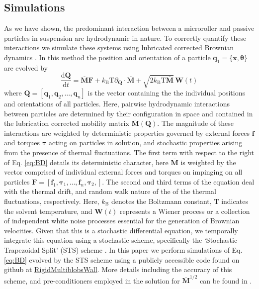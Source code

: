 \documentclass[12pt]{article}
\begin{document}
\subsection*{Simulations}

As we have shown, the predominant interaction between a microroller and passive particles in suspension are hydrodynamic in nature. To correctly quantify these interactions we simulate these systems using lubricated corrected Brownian dynamics \cite{sprinkle_driven_2020}. In this method the position and orientation of a particle $\mathbf{q}_1 = \{ \mathbf{x}, \mathbf{\theta} \}$ are evolved by 
\begin{equation}
    \frac{\mathrm{d} \mathbf{Q}}{\mathrm{d} t} = \overline{\mathbf{M}} \mathbf{F} + k_\mathrm{B} \mathrm{T} \partial_\mathbf{Q} \cdot \overline{\mathbf{M}} + \sqrt{2 k_\mathrm{B} \mathrm{T} \overline{\mathbf{M}}} \, \mathcal{\mathbf{W}}(t)
\label{eq:BD}
\end{equation}
where $\mathbf{Q} = \left [ \mathbf{q}_1, \mathbf{q}_2, \dots, \mathbf{q}_n \right ]$ is the vector containing the the individual positions and orientations of all particles. Here, pairwise hydrodynamic interactions between particles are determined by their configuration in space and contained in the lubrication corrected mobility matrix $\overline{\mathbf{M}} \left ( \mathbf{Q} \right )$. The magnitude of these interactions are weighted by deterministic properties governed by external forces $\mathbf{f}$ and torques $\mathbf{\tau}$ acting on particles in solution, and stochastic properties arising from the presence of thermal fluctuations. The first term with respect to the right of Eq. \ref{eq:BD} details its deterministic character, here $\overline{\mathbf{M}}$ is weighted by the vector comprised of individual external forces and torques on impinging on all particles $\mathbf{F} = \left [ \mathbf{f}_1, \mathbf{\tau}_1, \dots, \mathbf{f}_n, \mathbf{\tau}_2, \right ]$. The second and third terms of the equation deal with the thermal drift, and random walk nature of the of the thermal fluctuations, respectively. Here, $k_\mathrm{B}$ denotes the Boltzmann constant, $\mathrm{T}$ indicates the solvent temperature, and $\mathcal{\mathbf{W}}(t)$ represents a Wiener process or a collection of independent white noise processes essential for the generation of Brownian velocities. Given that this is a stochastic differential equation, we temporally integrate this equation using a stochastic scheme, specifically the ‘Stochastic Trapezoidal Split’ (STS) scheme \cite{sprinkle_driven_2020}. In this paper we perform simulations of Eq. \ref{eq:BD} evolved by the STS scheme using a publicly accessible code found on github at \href{https://github.com/stochasticHydroTools/RigidMultiblobsWall}{RigidMultiblobsWall}. More details including the accuracy of this scheme, and pre-conditioners employed in the solution for $\overline{\mathbf{M}}^{1/2}$ can be found in \cite{sprinkle_driven_2020}.  
\end{document}
